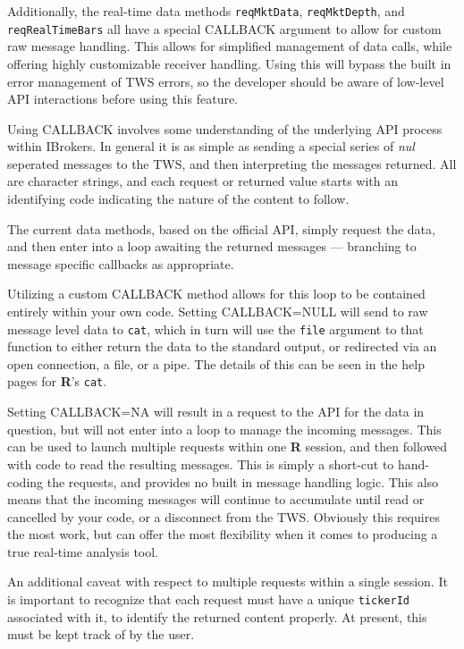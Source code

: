 \documentclass{article}
\begin{document}
Additionally, the
real-time data methods {\tt reqMktData}, {\tt reqMktDepth}, and
{\tt reqRealTimeBars} all have a special CALLBACK
argument to allow for custom raw message handling. This allows for
simplified management of data calls, while offering highly
customizable receiver handling. Using this will
bypass the built in error management of TWS errors, so the
developer should be aware of low-level API interactions
before using this feature.

Using CALLBACK involves some understanding of the underlying
API process within IBrokers.  In general it is as simple as
sending a special series of \emph{nul} seperated messages to the
TWS, and then interpreting the messages returned.  All are
character strings, and each request or returned
value  starts with an identifying
code indicating the nature of the content to follow.

The current data methods, based on the official API, simply
request the data, and then enter into a loop awaiting the returned
messages --- branching to message specific callbacks as appropriate.

Utilizing a custom CALLBACK method allows for this loop to be contained
entirely within your own code. Setting CALLBACK=NULL will send to raw
message level data to {\tt cat}, which in turn will use the {\tt file}
argument to that function to either return the data to the standard
output, or redirected via an open connection, a file, or a pipe.  The details
of this can be seen in the help pages for \textbf{R}'s {\tt cat}.

Setting CALLBACK=NA will result in a request to the API for the data
in question, but will not enter into a loop to manage the incoming messages.
This can be used to launch multiple requests within one \textbf{R} session, and then
followed with code to read the resulting messages.  This is simply a short-cut
to hand-coding the requests, and provides no built in message handling logic.
This also means that the incoming messages will continue to accumulate until
read or cancelled by your code, or a disconnect from the TWS.  Obviously this
requires the most work, but can offer the most flexibility when it comes to
producing a true real-time analysis tool.

An additional caveat with respect to multiple requests within a single session.
It is important to recognize that each request must have a unique {\tt tickerId}
associated with it, to identify the returned content properly.  At present,
this must be kept track of by the user.
\end{document}
